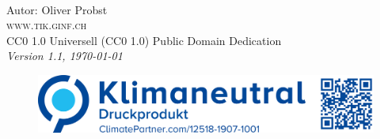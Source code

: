 \newpage
~\vfill
\thispagestyle{empty}

\noindent Autor: Oliver Probst\\

\noindent \textsc{www.tik.ginf.ch}\\

\noindent \ccLogo \hspace{0.1cm} \ccZero \hspace{0.1cm} CC0 1.0 Universell (CC0 1.0) Public Domain Dedication \\

\noindent \textit{Version 1.1, \today}

\begin{figure}[htb]
\includegraphics[scale=0.15]{climate}
\end{figure}
